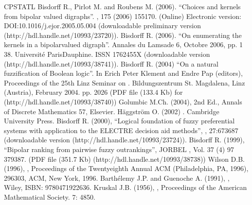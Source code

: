 \documentclass[a4paper,12pt,english]{sphinxhowto}
\begin{document}
\begin{sphinxthebibliography}{CPSTAT\sphinxhyphen{}L}
Bisdorff R., Pirlot M. and Roubens M. (2006). “Choices and kernels from bipolar valued digraphs”. , 175 (2006) 155\sphinxhyphen{}170. (Online) Electronic version: DOI:10.1016/j.ejor.2005.05.004 (downloadable preliminary version  (http://hdl.handle.net/10993/23720)).
Bisdorff R. (2006). “On enumerating the kernels in a bipolar\sphinxhyphen{}valued digraph”. Annales du Lamsade 6, Octobre 2006, pp. 1 \sphinxhyphen{} 38. Université Paris\sphinxhyphen{}Dauphine. ISSN 1762\sphinxhyphen{}455X (downloadable version  (http://hdl.handle.net/10993/38741)).
Bisdorff R. (2004) “On a natural fuzzification of Boolean logic”. In Erich Peter Klement and Endre Pap (editors), Proceedings of the 25th Linz Seminar on . Bildungszentrum St. Magdalena, Linz (Austria), February 2004. pp. 20\sphinxhyphen{}26 (PDF file (133.4 Kb) for  (http://hdl.handle.net/10993/38740))
Golumbic M.Ch. (2004),  2nd Ed., Annals of Discrete Mathematics 57, Elsevier.
Häggström O. (2002) . Cambridge University Press.
Bisdorff R. (2000), “Logical foundation of fuzzy preferential systems with application to the ELECTRE decision aid methods”, , 27:673\sphinxhyphen{}687 (downloadable version  (http://hdl.handle.net/10993/23724)).
Bisdorff R. (1999), “Bipolar ranking from pairwise fuzzy outrankings”, JORBEL , Vol. 37 (4) 97 379\sphinxhyphen{}387. (PDF file (351.7 Kb)  (http://hdl.handle.net/10993/38738))
Wilson D.B. (1996), , Proceedings of the Twenty\sphinxhyphen{}eighth Annual ACM  (Philadelphia, PA, 1996), 296\sphinxhyphen{}303, ACM, New York, 1996.
Barthélemy J.\sphinxhyphen{}P. and Guenoche A. (1991), , Wiley, ISBN: 978\sphinxhyphen{}0471922636.
Kruskal J.B. (1956), , Proceedings of the American Mathematical Society. 7: 48\textendash{}50.
\end{sphinxthebibliography}



\renewcommand{\indexname}{Index}
\printindex
\end{document}
